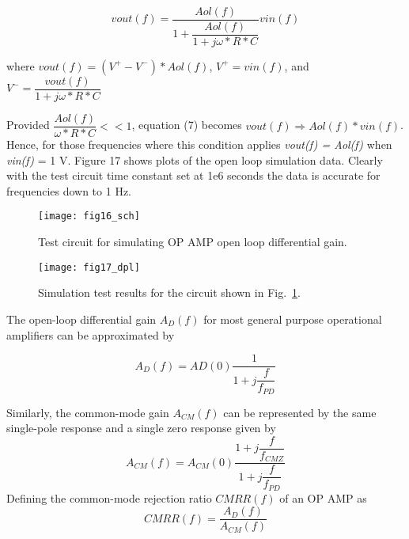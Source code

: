 \begin{equation}
vout(f) = \dfrac{ Aol(f)} { 1 +  \dfrac{ Aol(f) }{1 + j \omega * R * C} } vin(f)
\end{equation} 

where $vout(f) = (V^{+} - V^{-})*Aol(f)$,  $V^{+} = vin(f)$, and $V^{-} = \dfrac{vout(f)}{1 + j \omega * R * C} $

Provided $\dfrac{Aol(f)}{\omega*R*C} << 1$, equation (7) becomes $vout(f) \Rightarrow Aol(f) * vin(f)$. Hence, for those frequencies where this condition applies \textit{vout(f) = Aol(f)} when\textit{ vin(f)} = 1 V.  Figure 17 shows plots of the open loop simulation data. Clearly with the test circuit time constant set at 1e6 seconds the data is accurate for frequencies down to 1 Hz. 


\begin{figure}
  \centering
  \texttt{[image: fig16\_sch]}
  \caption{Test circuit for simulating OP AMP open loop differential gain.}  
  \label{fig:opamp16}
\end{figure}

\begin{figure}
  \centering
  \texttt{[image: fig17\_dpl]}
  \caption{Simulation test results for the circuit shown in Fig.~\ref{fig:opamp16}.}
  \label{fig:opamp17}
\end{figure}


The open-loop differential gain $A_{D}(f)$ for most general purpose operational amplifiers can be approximated by

\begin{equation}
A_{D}(f)=AD(0)\dfrac{1}{1+j\dfrac{f}{f_{PD}}}
\end{equation}

Similarly, the common-mode gain $A_{CM}(f)$ can be represented by the same single-pole response and a single zero response given by
\begin{equation}
A_{CM}(f)=A_{CM}(0)\dfrac{1+j\dfrac{f}{f_{CMZ}}}{1+j\dfrac{f}{f_{PD}}}
\end{equation}
Defining the common-mode rejection ratio $CMRR(f)$ of an OP AMP as
\begin{equation}
CMRR(f)=\dfrac{A_{D}(f)}{A_{CM}(f)}
\end{equation}

